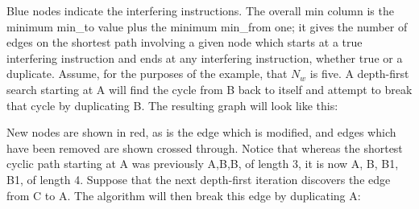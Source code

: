 
Blue nodes indicate the interfering instructions.  The overall min
column is the minimum min\_to value plus the minimum min\_from one; it
gives the number of edges on the shortest path involving a given node
which starts at a true interfering instruction and ends at any
interfering instruction, whether true or a duplicate.  Assume, for the
purposes of the example, that $N_w$ is five.  A depth-first search
starting at A will find the cycle from B back to itself and attempt to
break that cycle by duplicating B.  The resulting graph will look like
this:


New nodes are shown in red, as is the edge which is modified, and
edges which have been removed are shown crossed through.  Notice that
whereas the shortest cyclic path starting at A was previously A,B,B,
of length 3, it is now A, B, B1, B1, of length 4.  Suppose that the
next depth-first iteration discovers the edge from C to A.  The
algorithm will then break this edge by duplicating A:

